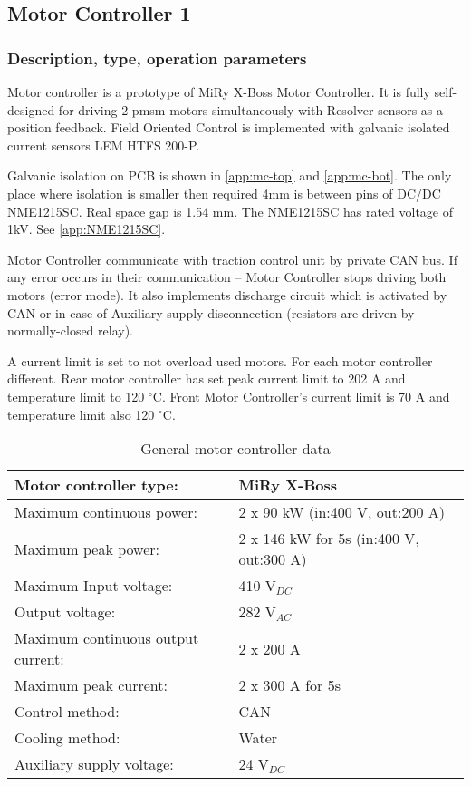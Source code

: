 \subsection{Motor Controller 1}

\subsubsection{Description, type, operation parameters}
Motor controller is a prototype of MiRy X-Boss Motor Controller. It is fully self-designed for driving 2 \gls{pmsm} motors simultaneously with Resolver sensors as a position feedback. Field Oriented Control is implemented with galvanic isolated current sensors LEM HTFS 200-P.

Galvanic isolation on PCB is shown in \ref{app:mc-top} and \ref{app:mc-bot}. The only place where isolation is smaller then required 4mm is between pins of DC/DC NME1215SC. Real space gap is 1.54 mm. The NME1215SC has rated voltage of 1kV. See \ref{app:NME1215SC}.

Motor Controller communicate with traction control unit by private CAN bus. If any error occurs in their communication – Motor Controller stops driving both motors (error mode). It also implements discharge circuit which is activated by CAN or in case of Auxiliary supply disconnection (resistors are driven by normally-closed relay).

A current limit is set to not overload used motors. For each motor controller different. Rear motor controller has set peak current limit to 202 A and temperature limit to 120 $^\circ$C. Front Motor Controller’s current limit is 70 A and temperature limit also 120 $^\circ$C.

\begin{table}[H]
	\centering
	\caption{General motor controller data}
	\begin{tabu}{|X|X|}\hline
		Motor controller type: & MiRy X-Boss \\\hline
		Maximum continuous power: & 2 x 90 kW (in:400 V, out:200 A) \\\hline
		Maximum peak power: & 2 x 146 kW for 5s (in:400 V, out:300 A) \\\hline
		Maximum Input voltage: & 410 V$_{DC}$ \\\hline
		Output voltage: & 282 V$_{AC}$ \\\hline
		Maximum continuous output current: & 2 x 200 A \\\hline
		Maximum peak current: & 2 x 300 A for 5s \\\hline
		Control method: & CAN \\\hline
		Cooling method: & Water \\\hline
		Auxiliary supply voltage: & 24 V$_{DC}$ \\\hline
	\end{tabu}%
	\label{tab:MC:general}%
\end{table}%

